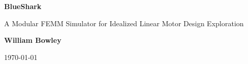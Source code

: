 \documentclass{article}
\begin{document}
\begin{titlepage}
   \begin{center}
       \vspace*{1cm}

       {\Huge \textbf{BlueShark}} 

       \vspace{0.5cm}

       {\Large A Modular FEMM Simulator for Idealized Linear Motor Design Exploration}

       \vspace{1.5cm}

       {\Large \textbf{William Bowley}}

       \vfill

       {\large \today}

   \end{center}
\end{titlepage}
\end{document}
